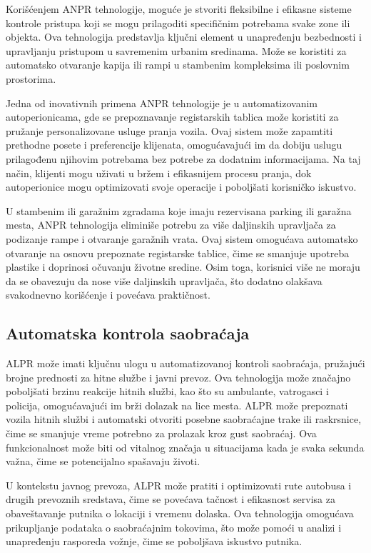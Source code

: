 \documentclass[a4paper,12pt]{article}
\begin{document}
	Korišćenjem ANPR tehnologije, moguće je stvoriti fleksibilne i efikasne sisteme kontrole pristupa koji se mogu prilagoditi specifičnim potrebama svake zone ili objekta. Ova tehnologija predstavlja ključni element u unapređenju bezbednosti i upravljanju pristupom u savremenim urbanim sredinama.
	Može se koristiti za automatsko otvaranje kapija ili rampi u stambenim kompleksima ili poslovnim prostorima.
	
	Jedna od inovativnih primena ANPR tehnologije je u automatizovanim autoperionicama, gde se prepoznavanje registarskih tablica može koristiti za pružanje personalizovane usluge pranja vozila. Ovaj sistem može zapamtiti prethodne posete i preferencije klijenata, omogućavajući im da dobiju uslugu prilagođenu njihovim potrebama bez potrebe za dodatnim informacijama. Na taj način, klijenti mogu uživati u bržem i efikasnijem procesu pranja, dok autoperionice mogu optimizovati svoje operacije i poboljšati korisničko iskustvo.
	
	U stambenim ili garažnim zgradama koje imaju rezervisana parking ili garažna mesta, ANPR tehnologija eliminiše potrebu za više daljinskih upravljača za podizanje rampe i otvaranje garažnih vrata. Ovaj sistem omogućava automatsko otvaranje na osnovu prepoznate registarske tablice, čime se smanjuje upotreba plastike i doprinosi očuvanju životne sredine. Osim toga, korisnici više ne moraju da se obavezuju da nose više daljinskih upravljača, što dodatno olakšava svakodnevno korišćenje i povećava praktičnost.
	
	\subsection{Automatska kontrola saobraćaja}
	ALPR može imati ključnu ulogu u automatizovanoj kontroli saobraćaja, pružajući brojne prednosti za hitne službe i javni prevoz. Ova tehnologija može značajno poboljšati brzinu reakcije hitnih službi, kao što su ambulante, vatrogasci i policija, omogućavajući im brži dolazak na lice mesta. ALPR može prepoznati vozila hitnih službi i automatski otvoriti posebne saobraćajne trake ili raskrsnice, čime se smanjuje vreme potrebno za prolazak kroz gust saobraćaj. Ova funkcionalnost može biti od vitalnog značaja u situacijama kada je svaka sekunda važna, čime se potencijalno spašavaju životi.
	
	U kontekstu javnog prevoza, ALPR može pratiti i optimizovati rute autobusa i drugih prevoznih sredstava, čime se povećava tačnost i efikasnost servisa za obaveštavanje putnika o lokaciji i vremenu dolaska. Ova tehnologija omogućava prikupljanje podataka o saobraćajnim tokovima, što može pomoći u analizi i unapređenju rasporeda vožnje, čime se poboljšava iskustvo putnika.
	\newpage
	
\end{document}
